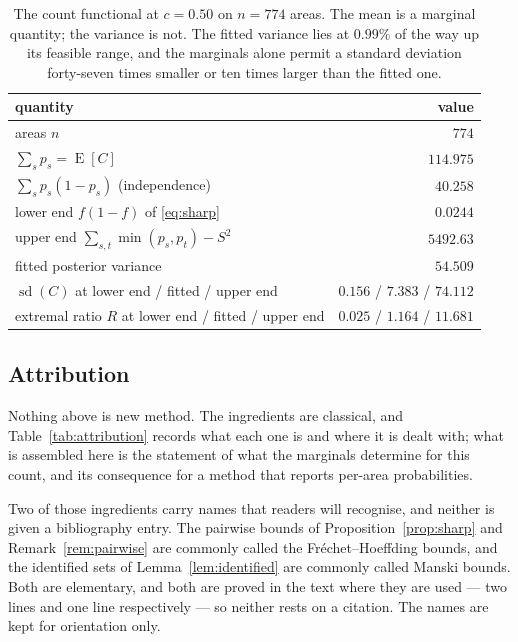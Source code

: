 \begin{table}[htbp]
\centering
\begin{tabular}{lr}
\hline
quantity & value \\
\hline
areas $n$ & $774$ \\
$\sum_s p_s = \operatorname{E}[C]$ & $114.975$ \\
$\sum_s p_s(1-p_s)$ (independence) & $40.258$ \\
lower end $f(1-f)$ of \eqref{eq:sharp} & $0.0244$ \\
upper end $\sum_{s,t}\min(p_s,p_t)-S^2$ & $5492.63$ \\
fitted posterior variance & $54.509$ \\
$\operatorname{sd}(C)$ at lower end / fitted / upper end & $0.156$ / $7.383$ / $74.112$ \\
extremal ratio $R$ at lower end / fitted / upper end & $0.025$ / $1.164$ / $11.681$ \\
\hline
\end{tabular}
\caption{The count functional at $c=0.50$ on $n=774$ areas.  The mean is a
marginal quantity; the variance is not.  The fitted variance lies at $0.99\%$
of the way up its feasible range, and the marginals alone permit a standard
deviation forty-seven times smaller or ten times larger than the fitted one.}
\label{tab:countnumbers}
\end{table}

\subsection*{Attribution}

Nothing above is new method.  The ingredients are classical, and
Table~\ref{tab:attribution} records what each one is and where it is dealt
with; what is assembled here is the statement of what the marginals determine
for this count, and its consequence for a method that reports per-area
probabilities.

Two of those ingredients carry names that readers will recognise, and neither
is given a bibliography entry.  The pairwise bounds of
Proposition~\ref{prop:sharp} and Remark~\ref{rem:pairwise} are commonly called
the Fr\'echet--Hoeffding bounds, and the identified sets of
Lemma~\ref{lem:identified} are commonly called Manski bounds.  Both are
elementary, and both are proved in the text where they are used --- two lines
and one line respectively --- so neither rests on a citation.  The names are
kept for orientation only.


